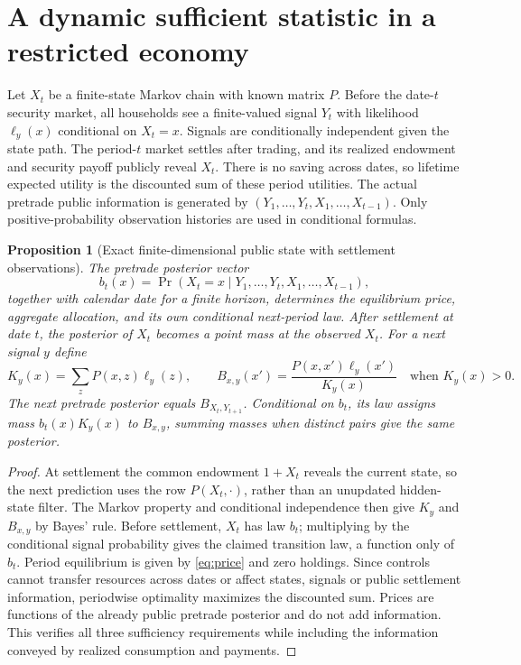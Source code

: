 \documentclass[11pt]{article}
\newtheorem{proposition}[theorem]{Proposition}
\theoremstyle{definition}
\theoremstyle{remark}
\begin{document}
\section{A dynamic sufficient statistic in a restricted economy}
Let $X_t$ be a finite-state Markov chain with known matrix $P$. Before the date-$t$ security market, all households see a finite-valued signal $Y_t$ with likelihood $\ell_y(x)$ conditional on $X_t=x$. Signals are conditionally independent given the state path. The period-$t$ market settles after trading, and its realized endowment and security payoff publicly reveal $X_t$. There is no saving across dates, so lifetime expected utility is the discounted sum of these period utilities. The actual pretrade public information is generated by $(Y_1,\ldots,Y_t,X_1,\ldots,X_{t-1})$. Only positive-probability observation histories are used in conditional formulas.

\begin{proposition}[Exact finite-dimensional public state with settlement observations]
The pretrade posterior vector
\[
 b_t(x)=\Pr(X_t=x\mid Y_1,\ldots,Y_t,X_1,\ldots,X_{t-1}),
\]
together with calendar date for a finite horizon, determines the equilibrium price, aggregate allocation, and its own conditional next-period law. After settlement at date $t$, the posterior of $X_t$ becomes a point mass at the observed $X_t$. For a next signal $y$ define
\[
 K_y(x)=\sum_z P(x,z)\ell_y(z),\qquad
 B_{x,y}(x')=\frac{P(x,x')\ell_y(x')}{K_y(x)}
 \quad\text{when }K_y(x)>0.
\]
The next pretrade posterior equals $B_{X_t,Y_{t+1}}$. Conditional on $b_t$, its law assigns mass $b_t(x)K_y(x)$ to $B_{x,y}$, summing masses when distinct pairs give the same posterior.
\end{proposition}
\begin{proof}
At settlement the common endowment $1+X_t$ reveals the current state, so the next prediction uses the row $P(X_t,\cdot)$, rather than an unupdated hidden-state filter. The Markov property and conditional independence then give $K_y$ and $B_{x,y}$ by Bayes' rule. Before settlement, $X_t$ has law $b_t$; multiplying by the conditional signal probability gives the claimed transition law, a function only of $b_t$. Period equilibrium is given by \eqref{eq:price} and zero holdings. Since controls cannot transfer resources across dates or affect states, signals or public settlement information, periodwise optimality maximizes the discounted sum. Prices are functions of the already public pretrade posterior and do not add information. This verifies all three sufficiency requirements while including the information conveyed by realized consumption and payments.
\end{proof}
\end{document}
